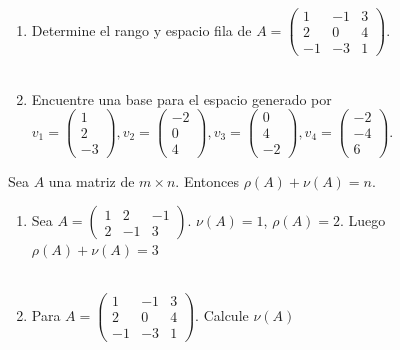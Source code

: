 \begin{ejem}
\begin{enumerate}
\item
Determine el rango y espacio fila de $A = \begin{pmatrix} 1 & -1 & 3 \\ 2 & 0 & 4 \\ -1 & -3 & 1 \end{pmatrix}$. 
\\\

\item
Encuentre una base para el espacio generado por $v_1 = \begin{pmatrix} 1 \\ 2 \\ -3 \end{pmatrix}, v_2 = \begin{pmatrix} -2 \\ 0 \\ 4 \end{pmatrix}, v_3 = \begin{pmatrix} 0 \\ 4 \\ -2 \end{pmatrix}, v_4 = \begin{pmatrix} -2 \\ -4 \\ 6 \end{pmatrix}$.
\end{enumerate}
\end{ejem}

\begin{thm}
Sea $A$ una matriz de $m \times n$. Entonces $\rho(A) + \nu (A) = n$.
\end{thm}




\begin{ejem}
\begin{enumerate}
    \item 
Sea $A = \begin{pmatrix} 1 & 2 & -1 \\ 2 & -1 & 3 \end{pmatrix}$. $\nu(A) = 1$, $\rho(A) = 2$. Luego $\rho(A) + \nu(A) = 3$
\\\

\item
Para $A = \begin{pmatrix} 1 & -1 & 3 \\ 2 & 0 & 4 \\ -1 & -3 & 1 \end{pmatrix}$. Calcule $\nu(A)$
\end{enumerate}
\end{ejem}

